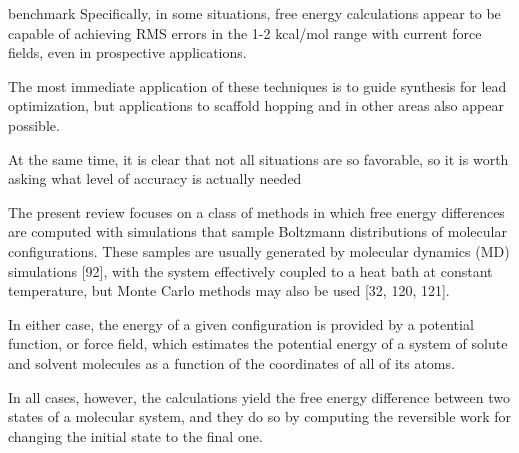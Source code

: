 benchmark
Specifically, in some
situations, free energy calculations appear to be capable
of achieving RMS errors in the 1-2 kcal/mol range with
current force fields, even in prospective applications.

The most immediate application of these techniques is to guide synthesis for lead optimization, but applications to scaffold
hopping and in other areas also appear possible.

At the same time, it is clear that not all situations are
so favorable, so it is worth asking what level of accuracy
is actually needed

The present review focuses on a class of methods in
which free energy differences are computed with simulations that sample Boltzmann distributions of molecular configurations. These samples are usually generated by molecular dynamics (MD) simulations [92], with
the system effectively coupled to a heat bath at constant temperature, but Monte Carlo methods may also
be used [32, 120, 121]. 

In either case, the energy of a
given configuration is provided by a potential function,
or force field, which estimates the potential energy of
a system of solute and solvent molecules as a function
of the coordinates of all of its atoms.

In all cases, however, the calculations yield the free energy
difference between two states of a molecular system, and
they do so by computing the reversible work for changing
the initial state to the final one. 